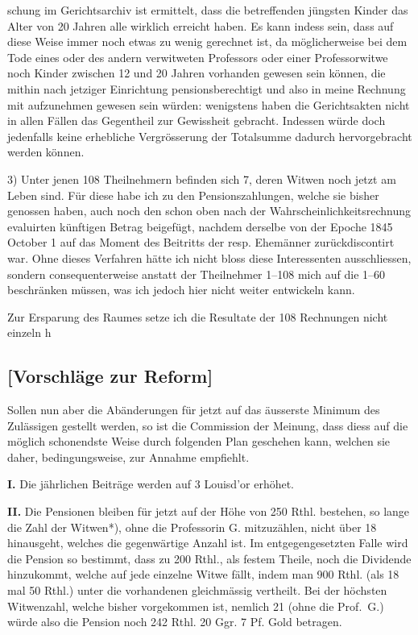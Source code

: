 \documentclass[12pt,a4paper]{article}
\begin{document}
schung im Gerichtsarchiv ist ermittelt, dass die betreffenden jüngsten Kinder das Alter von 20 Jahren alle wirklich erreicht haben. Es kann indess sein, dass auf diese Weise immer noch etwas zu wenig gerechnet ist, da möglicherweise bei dem Tode eines oder des andern verwitweten Professors oder einer Professorwitwe noch Kinder zwischen 12 und 20 Jahren vorhanden gewesen sein können, die mithin nach jetziger Einrichtung pensionsberechtigt und also in meine Rechnung mit aufzunehmen gewesen sein würden: wenigstens haben die Gerichtsakten nicht in allen Fällen das Gegentheil zur Gewissheit gebracht. Indessen würde doch jedenfalls keine erhebliche Vergrösserung der Totalsumme dadurch hervorgebracht werden können.

3) Unter jenen 108 Theilnehmern befinden sich 7, deren Witwen noch jetzt am Leben sind. Für diese habe ich zu den Pensionszahlungen, welche sie bisher genossen haben, auch noch den schon oben nach der Wahrscheinlichkeitsrechnung evaluirten künftigen Betrag beigefügt, nachdem derselbe von der Epoche 1845 October 1 auf das Moment des Beitritts der resp. Ehemänner zurückdiscontirt war. Ohne dieses Verfahren hätte ich nicht bloss diese Interessenten ausschliessen, sondern consequenterweise anstatt der Theilnehmer 1--108 mich auf die 1--60 beschränken müssen, was ich jedoch hier nicht weiter entwickeln kann.

Zur Ersparung des Raumes setze ich die Resultate der 108 Rechnungen nicht einzeln h

\subsection*{[Vorschläge zur Reform]}

Sollen nun aber die Abänderungen für jetzt auf das äusserste Minimum des Zulässigen gestellt werden, so ist die Commission der Meinung, dass diess auf die möglich schonendste Weise durch folgenden Plan geschehen kann, welchen sie daher, bedingungsweise, zur Annahme empfiehlt.

\textbf{I.} Die jährlichen Beiträge werden auf 3 Louisd'or erhöhet.

\textbf{II.} Die Pensionen bleiben für jetzt auf der Höhe von 250 Rthl. bestehen, so lange die Zahl der Witwen{}*), ohne die Professorin G. mitzuzählen, nicht über 18 hinausgeht, welches die gegenwärtige Anzahl ist. Im entgegengesetzten Falle wird die Pension so bestimmt, dass zu 200 Rthl., als festem Theile, noch die Dividende hinzukommt, welche auf jede einzelne Witwe fällt, indem man 900 Rthl. (als 18 mal 50 Rthl.) unter die vorhandenen gleichmässig vertheilt. Bei der höchsten Witwenzahl, welche bisher vorgekommen ist, nemlich 21 (ohne die Prof.~G.) würde also die Pension noch 242 Rthl. 20 Ggr. 7 Pf. Gold betragen.
\end{document}
